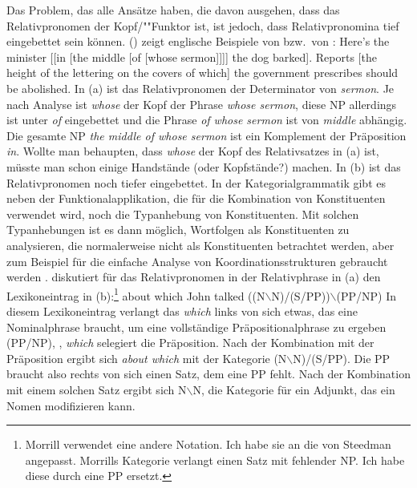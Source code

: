 Das Problem, das alle Ansätze haben, die davon ausgehen, dass das Relativpronomen der
Kopf/""Funktor ist, ist jedoch, dass Relativpronomina tief eingebettet sein können.
() zeigt englische Beispiele von \citet[]{ps2} bzw.\ von \citet[]{Ross67}\nocite{Ross86a-u}:
\eal
\ex Here's the minister [[in [the middle [of [whose sermon]]]] the dog barked].
\ex Reports [the height of the lettering on the covers of which] the government prescribes should be abolished.
\zl
In (a) ist das Relativpronomen der Determinator von \emph{sermon}.
Je nach Analyse ist \emph{whose} der Kopf der Phrase \emph{whose sermon},
diese NP allerdings ist unter \emph{of} eingebettet und die Phrase \emph{of whose sermon}
ist von \emph{middle} abhängig. Die gesamte NP \emph{the middle of whose sermon}
ist ein Komplement der Präposition \emph{in}. Wollte man behaupten, dass \emph{whose}
der Kopf des Relativsatzes in (a) ist, müsste man schon einige Handstände (oder Kopfstände?)
machen. In (b) ist das Relativpronomen noch tiefer eingebettet.
In der Kategorialgrammatik gibt es neben der Funktionalapplikation, die
für die Kombination von Konstituenten verwendet wird, noch die Typanhebung von
Konstituenten. Mit solchen Typanhebungen ist es dann möglich, Wortfolgen als
Konstituenten zu analysieren, die normalerweise nicht als Konstituenten betrachtet
werden, aber zum Beispiel für die einfache Analyse von Koordinationsstrukturen
gebraucht werden \citep{Steedman89a}. \citet[]{Morrill95a} diskutiert für das
Relativpronomen in der Relativphrase in (a) den Lexikoneintrag in (b):\footnote{
  Morrill verwendet eine andere Notation. Ich habe sie an die von Steedman angepasst. Morrills Kategorie verlangt einen Satz mit fehlender NP. Ich habe diese durch eine PP ersetzt.
}
\eal
\ex about which John talked
\ex ((N$\backslash$N)/(S/PP))$\backslash$(PP/NP)
\zl
In diesem Lexikoneintrag verlangt das \emph{which} links von sich etwas, das eine Nominalphrase
braucht, um eine vollständige Präpositionalphrase zu ergeben (PP/NP), \dash, \emph{which} selegiert die
Präposition. Nach der Kombination mit der Präposition ergibt sich \emph{about which} mit der Kategorie (N$\backslash$N)/(S/PP). Die PP braucht also rechts von sich einen Satz, dem eine PP fehlt. Nach der Kombination mit einem solchen Satz ergibt sich N$\backslash$N, die Kategorie für ein Adjunkt, das ein Nomen modifizieren kann.
 
